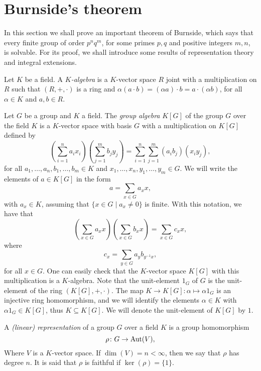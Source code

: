 \section*{Burnside's theorem}

In this section we shall prove an important theorem of Burnside, which says that every finite group of order $p^nq^m$, for some primes $p,q$ and positive integers $m,n$, is solvable. For its proof, we shall introduce some results of representation theory and integral extensions. 

Let $K$ be a field. A {\em $K$-algebra} is a $K$-vector space $R$ joint with a multiplication on $R$ such that
$(R,+,\cdot)$ is a ring and $\alpha(a\cdot b)=(\alpha a)\cdot b=a\cdot (\alpha b)$, for all $\alpha\in K$ and $a,b\in R$.

Let $G$ be a group and $K$ a field. The {\em group algebra} $K[G]$ of the group $G$ over the field $K$ is a $K$-vector space with basis $G$
with a multiplication on $K[G]$ defined by
\[ \left(\sum_{i=1}^na_ix_i\right)\left(\sum_{j=1}^mb_jy_j\right)=\sum_{i=1}^n\sum_{j=1}^m(a_ib_j)(x_iy_j),\]
for all $a_1,\dots, a_n,b_1,\dots ,b_m\in K$ and $x_1,\dots ,x_n,y_1,\dots ,y_m\in G$.
We will write the elements of $a\in K[G]$ in the form
\[ a=\sum_{x\in G}a_xx,\]
with $a_x\in K$, assuming that $\{ x\in G\mid a_x\neq 0\}$ is finite. With this notation, we have that
\[\left(\sum_{x\in G}a_xx\right)\left(\sum_{x\in G}b_xx\right)=\sum_{x\in G}c_xx,\]
where
\[ c_x=\sum_{y\in G}a_yb_{y^{-1}x},\]
for all $x\in G$. One can easily check that the $K$-vector space $K[G]$ with this multiplication is a $K$-algebra. Note that the unit-element $1_G$ of $G$ is the unit-element of the ring $(K[G],+,\cdot)$. The map $K\to K[G]:\alpha\mapsto \alpha 1_G$ is an injective ring homomorphism, and we will identify the elements $\alpha\in K$ with $\alpha 1_G\in K[G]$, thus $K\subseteq K[G]$. We will denote the unit-element of $K[G]$ by $1$.

\begin{definition}
A {\em (linear) representation} of a group $G$ over a field $K$ is a group homomorphism 
\[\rho\colon G\rightarrow \operatorname{Aut}(V),\]
Where $V$ is a $K$-vector space. If $\dim(V)=n<\infty$, then we say that $\rho$ has degree $n$. It is said that $\rho$ is faithful if $\ker(\rho)=\{ 1\}$.
\end{definition}

